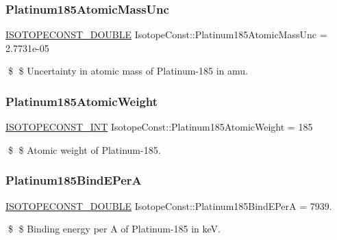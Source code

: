 \subsubsection{\texorpdfstring{Platinum185\+Atomic\+Mass\+Unc}{Platinum185AtomicMassUnc}}
{\footnotesize\ttfamily \mbox{\hyperlink{group___isotope_const-_macros_ga8f45a7272ce02c0b4c65c44636ed719a}{I\+S\+O\+T\+O\+P\+E\+C\+O\+N\+S\+T\+\_\+\+D\+O\+U\+B\+LE}} Isotope\+Const\+::\+Platinum185\+Atomic\+Mass\+Unc = 2.\+7731e-\/05}

\$ \$ Uncertainty in atomic mass of Platinum-\/185 in amu. \mbox{\label{group___isotope_const-_platinum-_pt185_gad721f0f60e95dd5baed958e2af78084e}} 
\subsubsection{\texorpdfstring{Platinum185\+Atomic\+Weight}{Platinum185AtomicWeight}}
{\footnotesize\ttfamily \mbox{\hyperlink{group___isotope_const-_macros_ga5f18360b3e99483a35c32d789e62621c}{I\+S\+O\+T\+O\+P\+E\+C\+O\+N\+S\+T\+\_\+\+I\+NT}} Isotope\+Const\+::\+Platinum185\+Atomic\+Weight = 185}

\$ \$ Atomic weight of Platinum-\/185. \mbox{\label{group___isotope_const-_platinum-_pt185_gaa2d7f90a13ad049420d322272f0a9dcd}} 
\subsubsection{\texorpdfstring{Platinum185\+Bind\+E\+PerA}{Platinum185BindEPerA}}
{\footnotesize\ttfamily \mbox{\hyperlink{group___isotope_const-_macros_ga8f45a7272ce02c0b4c65c44636ed719a}{I\+S\+O\+T\+O\+P\+E\+C\+O\+N\+S\+T\+\_\+\+D\+O\+U\+B\+LE}} Isotope\+Const\+::\+Platinum185\+Bind\+E\+PerA = 7939.}

\$ \$ Binding energy per A of Platinum-\/185 in keV. \mbox{\label{group___isotope_const-_platinum-_pt185_gaf7517850857b6ea02f43344f17518d44}} 
